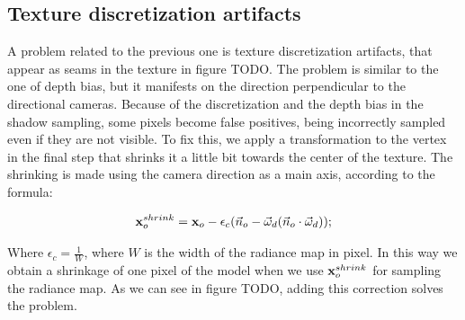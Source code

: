 \subsection{Texture discretization artifacts}
A problem related to the previous one is texture discretization artifacts, that appear as seams in the texture in figure TODO. The problem is similar to the one of depth bias, but it manifests on the direction perpendicular to the directional cameras. Because of the discretization and the depth bias in the shadow sampling, some pixels become false positives, being incorrectly sampled even if they are not visible. To fix this, we apply a transformation to the vertex in the final step that shrinks it a little bit towards the center of the texture. The shrinking is made using the camera direction as a main axis, according to the formula:

$$
\mathbf{x}_o^{shrink} = \mathbf{x}_o - \epsilon_c (\vec{n}_o - \vec{\omega}_d (\vec{n}_o \cdot \vec{\omega}_d));
$$

Where $\epsilon_c = \frac{1}{W}$, where $W$ is the width of the radiance map in pixel. In this way we obtain a shrinkage of one pixel of the model when we use $\mathbf{x}_o^{shrink}$ for sampling the radiance map. As we can see in figure TODO, adding this correction solves the problem.
